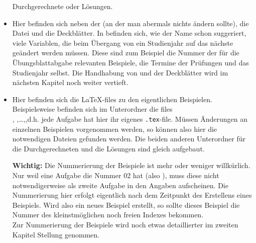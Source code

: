 \begin{itemize}
    Durchgerechnete oder Lösungen.
  \item {} Hier befinden sich neben der 
     (an der man abermals nichts ändern sollte), die
    Datei  und die Deckblätter. In 
    befinden sich, wie der Name schon suggeriert, viele Variablen, die beim
    Übergang von ein Studienjahr auf das nächste geändert werden müssen. Diese
    sind zum Beispiel die Nummer der für die Übungsblattabgabe relevanten
    Beispiele, die Termine der Prüfungen und das Studienjahr selbst. Die
    Handhabung von  und der Deckblätter wird im nächsten
    Kapitel noch weiter vertieft.
  \item {} Hier befinden sich die \LaTeX-files zu den
    eigentlichen Beispielen. Beispielsweise befinden sich im Unterordner
     die files \\,
    ,\dots,,d.h. jede Aufgabe
    hat hier ihr eigenes {\tt .tex}-file. Müssen Änderungen an einzelnen
    Beispielen vorgenommen werden, so können also hier die notwendigen Dateien
    gefunden werden. Die beiden anderen Unterordner für die Durchgerechneten 
    und die Lösungen sind gleich aufgebaut.

    {\bf Wichtig:} Die Nummerierung der Beispiele ist mehr oder weniger
    willkürlich. Nur weil eine Aufgabe die Nummer 02 hat (also 
    ), muss diese nicht notwendigerweise als zweite
    Aufgabe in den Angaben aufscheinen. Die Nummerierung hier erfolgt eigentlich
    nach dem Zeitpunkt des Erstellens eines Beispiels. Wird also ein neues
    Beispiel erstellt, so sollte dieses Beispiel die Nummer des kleinstmöglichen
    noch freien Indexes bekommen.\\
    Zur Nummerierung der Beispiele wird noch etwas detaillierter im zweiten
    Kapitel Stellung genommen.
\end{itemize}

